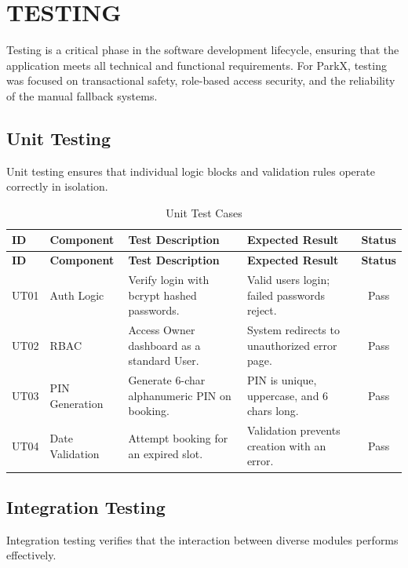 \chapter{TESTING}
Testing is a critical phase in the software development lifecycle, ensuring that the application meets all technical and functional requirements. For ParkX, testing was focused on transactional safety, role-based access security, and the reliability of the manual fallback systems.

\section{Unit Testing}
Unit testing ensures that individual logic blocks and validation rules operate correctly in isolation.

\begin{longtable}{|p{1.5cm}|p{3cm}|p{4.5cm}|p{4.5cm}|c|}
    \caption{Unit Test Cases} \label{tab:unit_tests} \\
    \hline
    \textbf{ID} & \textbf{Component} & \textbf{Test Description} & \textbf{Expected Result} & \textbf{Status} \\
    \hline
    \endfirsthead
    \hline
    \textbf{ID} & \textbf{Component} & \textbf{Test Description} & \textbf{Expected Result} & \textbf{Status} \\
    \hline
    \endhead
    UT01 & Auth Logic & Verify login with bcrypt hashed passwords. & Valid users login; failed passwords reject. & Pass \\
    \hline
    UT02 & RBAC & Access Owner dashboard as a standard User. & System redirects to unauthorized error page. & Pass \\
    \hline
    UT03 & PIN Generation & Generate 6-char alphanumeric PIN on booking. & PIN is unique, uppercase, and 6 chars long. & Pass \\
    \hline
    UT04 & Date Validation & Attempt booking for an expired slot. & Validation prevents creation with an error. & Pass \\
    \hline
\end{longtable}

\section{Integration Testing}
Integration testing verifies that the interaction between diverse modules performs effectively.

